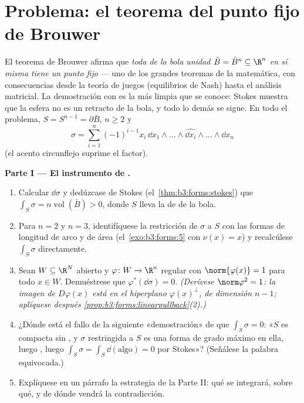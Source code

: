 \section{Problema: el teorema del punto fijo de Brouwer}

\begin{problem}\label{pb:b3:forms:1} El teorema de Brouwer afirma que
\emph{toda  de
la bola unidad 
$\bar B = \bar B^n \subseteq \R^n$ en sí misma tiene un punto fijo} ---
uno de los grandes teoremas de la matemática, con consecuencias desde la
teoría de juegos (equilibrios de Nash) hasta el análisis matricial. La
demostración con  es la más limpia que se conoce:
Stokes muestra que la esfera no es un retracto de la bola, y todo lo
demás se sigue. En todo el problema, $S = S^{n-1} = \partial\bar B$,
$n \geq 2$ y
\[
\sigma = \sum_{i=1}^n(-1)^{i-1}x_i\,
\dd x_1\wedge\dots\wedge\widehat{\dd x_i}\wedge\dots\wedge
\dd x_n
\]
(el acento circunflejo suprime el factor).

\medskip
\noindent\textbf{Parte I --- El instrumento de .}
\begin{enumerate}
  \item Calcular $\dd\sigma$ y dedúzcase de Stokes
  (el~\cref{thm:b3:forms:stokes}) que $\int_S\sigma =
        n\operatorname{vol}(\bar B) > 0$, donde $S$ lleva la
   de
   de la bola. \item Para $n = 2$ y
  $n = 3$, identifíquese la restricción de $\sigma$ a $S$ con las formas
  de longitud de arco y de área (el~\cref{exo:b3:forms:5} con
  $\nu(x) = x$) y recalcúlese $\int_S\sigma$ directamente. \item Sean
  $W \subseteq \R^N$ abierto y $\varphi\colon W
        \to \R^n$ regular con $\norm{\varphi(x)} = 1$ para todo
  $x \in W$. Demuéstrese que $\varphi^*(\dd\sigma) = 0$. \emph{(Derívese
  $\norm\varphi^2 = 1$: la imagen de $D\varphi(x)$ está en el hiperplano
  $\varphi(x)^\perp$, de dimensión $n - 1$; aplíquese después
        \cref{prop:b3:forms:linearpullback}(2).)}
  \item ¿Dónde está el fallo de la siguiente «demostración» de que
  $\int_S\sigma = 0$: «$S$ es compacta
  sin , y $\sigma$ restringida a
  $S$ es una forma de grado máximo en ella, luego
  , luego $\int_S\sigma =
        \int_S\dd(\text{algo}) = 0$ por Stokes»? (Señálese la
  palabra equivocada.) \item Explíquese en un párrafo la estrategia de
  la Parte II: qué se integrará, sobre qué, y de dónde vendrá la
  contradicción.
\end{enumerate}


\end{problem}
